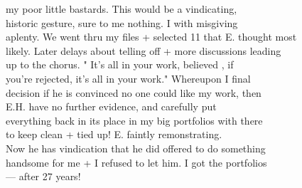 \documentclass[11pt,a4paper]{article}
\begin{document}
{my poor little bastards. This would be a vindicating, \\
historic gesture, sure to  me nothing. I with misgiving \\
aplenty. We went thru my files + selected 11 that E. thought most \\
likely. Later delays about telling off + more discussions leading \\
up to the chorus. " It's all in your work, believed , if \\
you're rejected, it's all in your work." Whereupon I  final \\
decision if he is convinced no one could like my work, then \\
 E.H. have no further evidence, and carefully put \\
everything back in its place in my big portfolios with  there \\
to keep  clean + tied up! E. faintly remonstrating. \\
Now he  has vindication that he did offered to do something \\
handsome for me + I refused to let him. I got the portfolios \\
\qquad --- after 27 years!}







\end{document}
